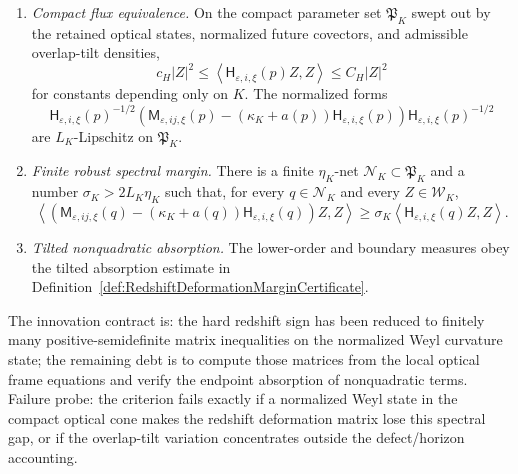 \begin{definition}
\begin{enumerate}
    \item \emph{Compact flux equivalence.}  On the compact parameter set
    $\mathfrak P_K$ swept out by the retained optical states, normalized future
    covectors, and admissible overlap-tilt densities,
    \[
        c_H|Z|^2
        \le
        \left\langle \mathsf H_{\varepsilon,i,\xi}(p)Z,Z\right\rangle
        \le
        C_H|Z|^2
    \]
    for constants depending only on $K$.  The normalized forms
    \[
        \mathsf H_{\varepsilon,i,\xi}(p)^{-1/2}
        \left(
            \mathsf M_{\varepsilon,ij,\xi}(p)
            -
            (\kappa_K+a(p))\mathsf H_{\varepsilon,i,\xi}(p)
        \right)
        \mathsf H_{\varepsilon,i,\xi}(p)^{-1/2}
    \]
    are $L_K$-Lipschitz on $\mathfrak P_K$.

    \item \emph{Finite robust spectral margin.}  There is a finite
    $\eta_K$-net $\mathcal N_K\subset\mathfrak P_K$ and a number
    $\sigma_K>2L_K\eta_K$ such that, for every $q\in\mathcal N_K$ and every
    $Z\in\mathcal W_K$,
    \[
        \left\langle
        \left(
            \mathsf M_{\varepsilon,ij,\xi}(q)
            -
            (\kappa_K+a(q))\mathsf H_{\varepsilon,i,\xi}(q)
        \right)Z,Z
        \right\rangle
        \ge
        \sigma_K
        \left\langle
        \mathsf H_{\varepsilon,i,\xi}(q)Z,Z
        \right\rangle .
    \]

    \item \emph{Tilted nonquadratic absorption.}  The lower-order and boundary
    measures obey the tilted absorption estimate in
    Definition~\ref{def:RedshiftDeformationMarginCertificate}.
\end{enumerate}
The innovation contract is: the hard redshift sign has been reduced to finitely
many positive-semidefinite matrix inequalities on the normalized Weyl curvature
state; the remaining debt is to compute those matrices from the local optical
frame equations and verify the endpoint absorption of nonquadratic terms.
Failure probe: the criterion fails exactly if a normalized Weyl state in the
compact optical cone makes the redshift deformation matrix lose this spectral
gap, or if the overlap-tilt variation concentrates outside the defect/horizon
accounting.
\end{definition}

